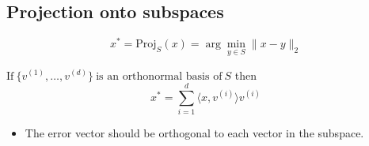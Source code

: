 \subsection{Projection onto subspaces}
    \begin{definition}
        \begin{equation}
            x^* = \text{Proj}_S(x) = \arg\min_{y \in S} \|x - y\|_2
        \end{equation}


        $\text{If} \ \{v^{(1)}, \dots, v^{(d)}\} \ \text{is an orthonormal basis of} \ S$ then 
        \begin{equation}
            x^* = \sum_{i=1}^{d} \langle x, v^{(i)} \rangle v^{(i)}
        \end{equation}
        \begin{itemize}
            \item The error vector should be orthogonal to each vector in the subspace.
        \end{itemize}

    \end{definition}

